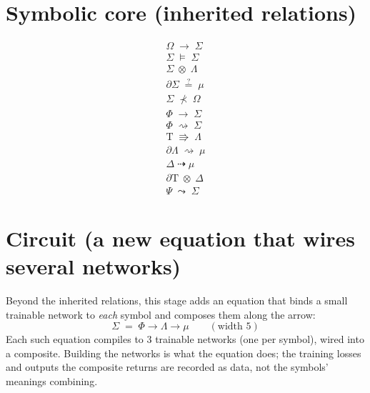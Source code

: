 \documentclass[11pt]{article}
\newcommand{\Tau}{\mathrm{T}}
\begin{document}
\section*{Symbolic core (inherited relations)}\begin{align*}
\Omega \; \longrightarrow \; \Sigma \\[3pt] \Sigma \; \models \; \Sigma \\[3pt] \Sigma \; \otimes \; \Lambda \\[3pt] \partial \Sigma \; \stackrel{?}{=} \; \mu \\[3pt] \Sigma \; \nprec \; \Omega \\[3pt] \Phi \; \longrightarrow \; \Sigma \\[3pt] \Phi \; \rightsquigarrow \; \Sigma \\[3pt] \Tau \; \Rrightarrow \; \Lambda \\[3pt] \partial \Lambda \; \rightsquigarrow \; \mu \\[3pt] \Delta \; \dashrightarrow \; \mu \\[3pt] \partial \Tau \; \otimes \; \Delta \\[3pt] \Psi \; \leadsto \; \Sigma
\end{align*}
\section*{Circuit (a new equation that wires several networks)}Beyond the inherited relations, this stage adds an equation that binds a small trainable network to \emph{each} symbol and composes them along the arrow:\begin{equation*}\Sigma \;=\; \Phi \longrightarrow \Lambda \longrightarrow \mu \qquad (\text{width } 5)\end{equation*}Each such equation compiles to 3 trainable networks (one per symbol), wired into a composite. Building the networks is what the equation does; the training losses and outputs the composite returns are recorded as data, not the symbols' meanings combining.
\end{document}
